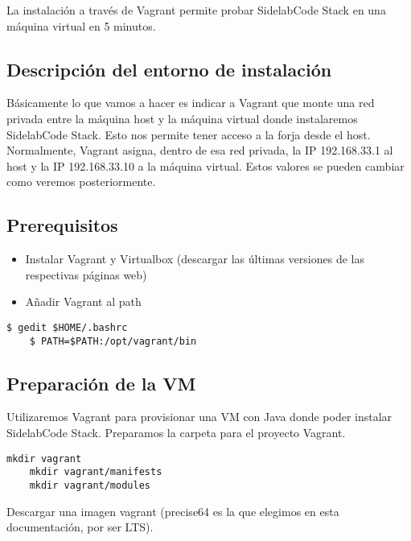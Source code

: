 \par La instalación a través de Vagrant permite probar SidelabCode Stack en una máquina virtual en 5 minutos.

\subsection{Descripción del entorno de instalación}
\label{sub:entorno-instalacion}

\par Básicamente lo que vamos a hacer es indicar a Vagrant que monte una red privada entre la máquina host y la máquina virtual donde instalaremos SidelabCode Stack. Esto nos permite tener acceso a la forja desde el host. Normalmente, Vagrant asigna, dentro de esa red privada, la IP 192.168.33.1 al host y la IP 192.168.33.10 a la máquina virtual. Estos valores se pueden cambiar como veremos posteriormente.

\subsection{Prerequisitos}
\label{sub:prerequisitos}

\begin{itemize}
    \item Instalar Vagrant y Virtualbox (descargar las últimas versiones de las respectivas páginas web)
    \item Añadir Vagrant al path
\end{itemize}

\lstset{style=rubybasico}
\begin{lstlisting}[frame=trbl]
    $ gedit $HOME/.bashrc
    $ PATH=$PATH:/opt/vagrant/bin
\end{lstlisting}

\subsection{Preparación de la VM}
\label{preparar-vm}

\par Utilizaremos Vagrant para provisionar una VM con Java donde poder instalar SidelabCode Stack. Preparamos la carpeta para el proyecto Vagrant.

\lstset{style=rubybasico}
\begin{lstlisting}[frame=trbl]
    mkdir vagrant
    mkdir vagrant/manifests
    mkdir vagrant/modules
\end{lstlisting}

\par Descargar una imagen vagrant (precise64 es la que elegimos en esta documentación, por ser LTS).

